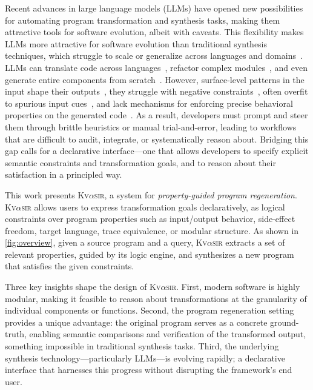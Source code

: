 \documentclass[nonacm,sigplan]{acmart}
\newcommand{\sys}{{\scshape Kv{$\alpha$}sir}\xspace}
\begin{document}
Recent advances in large language models (LLMs) have opened new possibilities for automating program transformation and synthesis tasks, making them attractive tools for software evolution, albeit with caveats.
This flexibility makes LLMs more attractive for software evolution than traditional synthesis techniques, which struggle to scale or generalize
across languages and domains~\cite{reynolds2019syguscomp,leino2016dafny,wu2023programming,dynamoth2016,cambronero2019active}.
LLMs can translate code across languages~\cite{ou2025enhancingllmbasedcodetranslation},
refactor complex modules~\cite{ziftci2025migrating},
and even generate entire components from scratch~\cite{huynh2025largelanguagemodelscode}.
However, surface-level patterns in the input shape their outputs~\cite{yang2025evaluatinggeneralizationcapabilitieslarge},
they struggle with negative constraints~\cite{hwang2024thinkpinkelephant,jiang2024llmsdreamelephantswhen},
often overfit to spurious input cues~\cite{xu2023llmfoolitselfpromptbased, wu2023deceptpromptexploitingllmdrivencode},
and lack mechanisms for enforcing precise behavioral properties on the generated code~\cite{roh2025breakthechainreasoningfailuresllms}.
As a result, developers must prompt and steer them through brittle heuristics or manual trial-and-error, leading to workflows that are difficult to audit, integrate, or systematically reason about.
Bridging this gap calls for a declarative interface---one that allows developers to specify explicit semantic constraints and transformation goals, and to reason about their satisfaction in a principled way.

This work presents \sys, a system for \emph{property-guided program regeneration}.
\sys allows users
to express transformation goals declaratively, as logical constraints over
program properties such as input/output behavior, side-effect freedom, target
language, trace equivalence, or modular structure.
As shown in \cref{fig:overview}, given a source program and
a query, \sys extracts a set of relevant properties, guided by its
logic engine, and synthesizes a new
program that satisfies the given constraints.

Three key insights shape the design of \sys.
First, modern software is highly modular, making it feasible to reason about transformations at the granularity of individual components or functions.
Second, the program regeneration setting provides a unique advantage: the original program serves as a concrete ground-truth, enabling semantic comparisons and verification of the transformed output, something impossible in traditional synthesis tasks.
Third, the underlying synthesis technology---particularly LLMs---is evolving rapidly; a declarative interface that harnesses this progress without disrupting the framework's end user.
\end{document}
